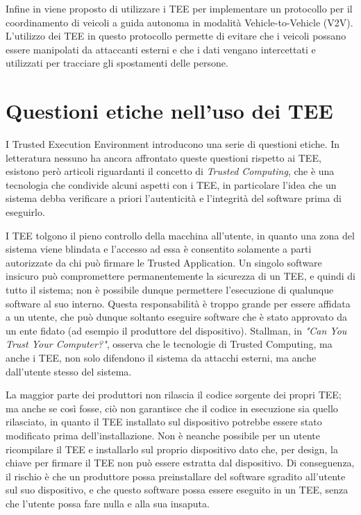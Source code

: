 \documentclass[12pt,italian]{report}
\begin{document}
\bigbreak \noindent

Infine in \cite{teeuses_vehicles} viene proposto di utilizzare i TEE per
implementare un protocollo per il coordinamento di veicoli a guida
autonoma in modalità Vehicle-to-Vehicle (V2V).
L'utilizzo dei TEE in questo protocollo permette di evitare che i veicoli
possano essere manipolati da attaccanti esterni e che i dati vengano
intercettati e utilizzati per tracciare gli spostamenti delle persone. 

\section{Questioni etiche nell'uso dei TEE}
\label{sec:etica-tee}
I Trusted Execution Environment introducono una serie di questioni etiche.
In letteratura nessuno ha ancora affrontato queste questioni rispetto ai TEE,
esistono però articoli riguardanti il concetto di \textit{Trusted Computing},
che è una tecnologia che condivide alcuni aspetti con i TEE, in particolare
l'idea che un sistema debba verificare a priori l'autenticità e l'integrità
del software prima di eseguirlo.

I TEE tolgono il pieno controllo della macchina all'utente, in quanto una
zona del sistema viene blindata e l'accesso ad essa è consentito solamente
a parti autorizzate da chi può firmare le Trusted Application.
Un singolo software insicuro può compromettere permanentemente la sicurezza
di un TEE, e quindi di tutto il sistema; non è possibile dunque permettere
l'esecuzione di qualunque software al suo interno.
Questa responsabilità è troppo grande per essere affidata a un utente,
che può dunque soltanto eseguire software che è stato approvato da un
ente fidato (ad esempio il produttore del dispositivo).
Stallman, in \textit{"Can You Trust Your Computer?"}\cite{stallman2021tpm},
osserva che le tecnologie di Trusted Computing, ma anche i TEE, non solo
difendono il sistema da attacchi esterni, ma anche dall'utente stesso
del sistema.

La maggior parte dei produttori non rilascia il codice sorgente
dei propri TEE; ma anche se così fosse, ciò non garantisce che il codice
in esecuzione sia quello rilasciato, in quanto il TEE installato sul
dispositivo potrebbe essere stato modificato prima dell'installazione.
Non è neanche possibile per un utente ricompilare il TEE e installarlo
sul proprio dispositivo dato che, per design, la chiave per firmare
il TEE non può essere estratta dal dispositivo.
Di conseguenza, il rischio è che un produttore possa preinstallare del
software sgradito all'utente sul suo dispositivo, e che questo software
possa essere eseguito in un TEE, senza che l'utente possa fare nulla
e alla sua insaputa.
\end{document}
